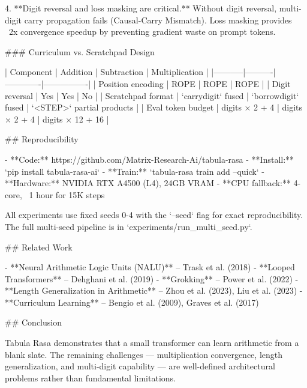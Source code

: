 4. **Digit reversal and loss masking are critical.** Without digit reversal,
   multi-digit carry propagation fails (Causal-Carry Mismatch). Loss masking
   provides ~2x convergence speedup by preventing gradient waste on prompt
   tokens.

### Curriculum vs. Scratchpad Design

| Component | Addition | Subtraction | Multiplication |
|-----------|----------|-------------|----------------|
| Position encoding | ROPE | ROPE | ROPE |
| Digit reversal | Yes | Yes | No |
| Scratchpad format | `{carry}{digit}` fused | `{borrow}{digit}` fused | `<STEP>` partial products |
| Eval token budget | digits × 2 + 4 | digits × 2 + 4 | digits × 12 + 16 |

## Reproducibility

- **Code:** https://github.com/Matrix-Research-Ai/tabula-rasa
- **Install:** `pip install tabula-rasa-ai`
- **Train:** `tabula-rasa train add --quick`
- **Hardware:** NVIDIA RTX A4500 (L4), 24GB VRAM
- **CPU fallback:** 4-core, ~1 hour for 15K steps

All experiments use fixed seeds 0-4 with the `--seed` flag for exact
reproducibility. The full multi-seed pipeline is in
`experiments/run_multi_seed.py`.

## Related Work

- **Neural Arithmetic Logic Units (NALU)** – Trask et al. (2018)
- **Looped Transformers** – Dehghani et al. (2019)
- **Grokking** – Power et al. (2022)
- **Length Generalization in Arithmetic** – Zhou et al. (2023), Liu et al. (2023)
- **Curriculum Learning** – Bengio et al. (2009), Graves et al. (2017)

## Conclusion

Tabula Rasa demonstrates that a small transformer can learn arithmetic from a
blank slate. The remaining challenges — multiplication convergence, length
generalization, and multi-digit capability — are well-defined architectural
problems rather than fundamental limitations.
